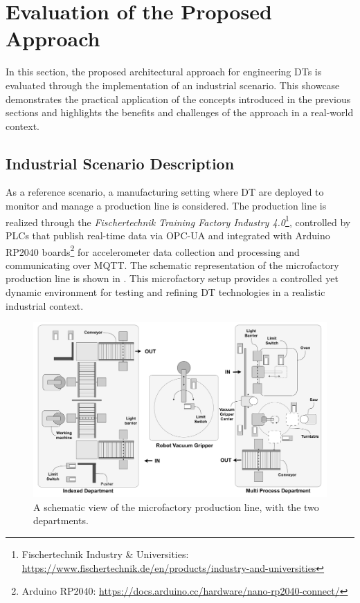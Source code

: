 \section{Evaluation of the Proposed Approach}

In this section, the proposed architectural approach for engineering \acp{DT} is evaluated through the implementation of an industrial scenario.
%
This showcase demonstrates the practical application of the concepts introduced in the previous sections and highlights the benefits and challenges of the approach in a real-world context.

\subsection{Industrial Scenario Description}
 \label{ssec:dte:dt-engineering:scenario}

As a reference scenario, a manufacturing setting where \ac{DT} are deployed to monitor and manage a production line is considered. 
%
The production line is realized through the \emph{Fischertechnik Training Factory Industry 4.0}\footnote{Fischertechnik Industry \& Universities: \url{https://www.fischertechnik.de/en/products/industry-and-universities}}, controlled by PLCs that publish real-time data via OPC-UA and integrated with Arduino RP2040 boards\footnote{Arduino RP2040: \url{https://docs.arduino.cc/hardware/nano-rp2040-connect/}} for accelerometer data collection and processing and communicating over MQTT.
The schematic representation of the microfactory production line is shown in .
This microfactory setup provides a controlled yet dynamic environment for testing and refining DT technologies in a realistic industrial context.

\begin{figure}[t]
    \centering
    \includegraphics[width=0.8\columnwidth]{figures/mf_highlevel_schema.pdf}
    \caption{A schematic view of the microfactory production line, with the two departments.}
    \label{fig:microfactory-production-line}
\end{figure}

